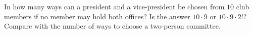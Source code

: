 In how many ways can a president and a vice-president be chosen from $10$ club members if no member may hold both offices? Is the answer $10\cdot9$ or $10\cdot9\cdot2!$? Compare with the number of ways to choose a two-person committee.
